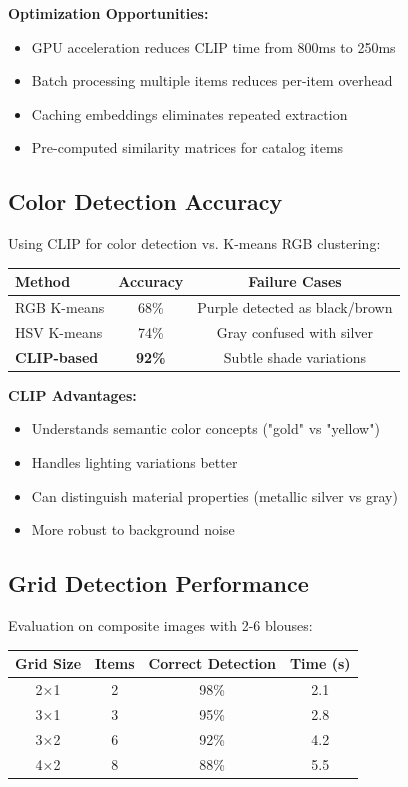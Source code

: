 \documentclass[12pt,a4paper]{report}
\begin{document}
\textbf{Optimization Opportunities:}
\begin{itemize}
    \item GPU acceleration reduces CLIP time from 800ms to 250ms
    \item Batch processing multiple items reduces per-item overhead
    \item Caching embeddings eliminates repeated extraction
    \item Pre-computed similarity matrices for catalog items
\end{itemize}

\subsection{Color Detection Accuracy}

Using CLIP for color detection vs. K-means RGB clustering:

\begin{center}
\begin{tabular}{|l|c|c|}
\hline
\textbf{Method} & \textbf{Accuracy} & \textbf{Failure Cases} \\
\hline
RGB K-means & 68\% & Purple detected as black/brown \\
HSV K-means & 74\% & Gray confused with silver \\
\textbf{CLIP-based} & \textbf{92\%} & Subtle shade variations \\
\hline
\end{tabular}
\end{center}

\textbf{CLIP Advantages:}
\begin{itemize}
    \item Understands semantic color concepts ("gold" vs "yellow")
    \item Handles lighting variations better
    \item Can distinguish material properties (metallic silver vs gray)
    \item More robust to background noise
\end{itemize}

\subsection{Grid Detection Performance}

Evaluation on composite images with 2-6 blouses:

\begin{center}
\begin{tabular}{|c|c|c|c|}
\hline
\textbf{Grid Size} & \textbf{Items} & \textbf{Correct Detection} & \textbf{Time (s)} \\
\hline
2×1 & 2 & 98\% & 2.1 \\
3×1 & 3 & 95\% & 2.8 \\
3×2 & 6 & 92\% & 4.2 \\
4×2 & 8 & 88\% & 5.5 \\
\hline
\end{tabular}
\end{center}
\end{document}
